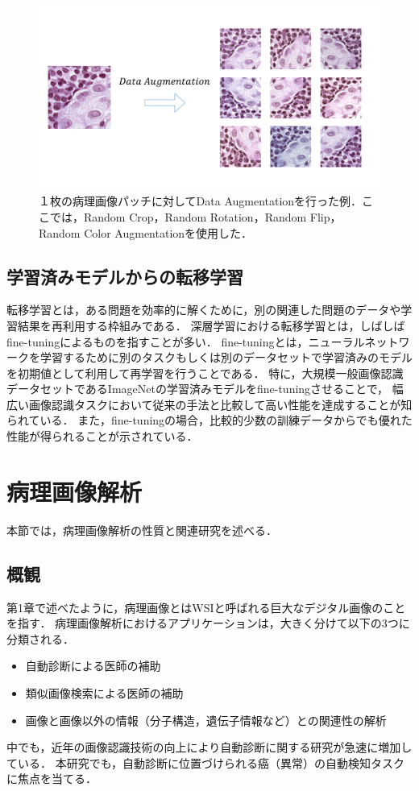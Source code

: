\begin{figure}[tbp]
     \begin{center}
      \includegraphics[width=12cm]{figures/data_augmentation.pdf}
     \end{center}
    \caption{\label{fig:data_augmentation}１枚の病理画像パッチに対してData Augmentationを行った例．ここでは，Random Crop，Random Rotation，Random Flip，Random Color Augmentationを使用した．}
\end{figure}

\subsection{学習済みモデルからの転移学習}
\label{sec:transfer}
転移学習とは，ある問題を効率的に解くために，別の関連した問題のデータや学習結果を再利用する枠組みである．
深層学習における転移学習とは，しばしばfine-tuningによるものを指すことが多い．
fine-tuningとは，ニューラルネットワークを学習するために別のタスクもしくは別のデータセットで学習済みのモデルを初期値として利用して再学習を行うことである．
特に，大規模一般画像認識データセットであるImageNet\cite{imagenet_cvpr09}の学習済みモデルをfine-tuningさせることで，
幅広い画像認識タスクにおいて従来の手法と比較して高い性能を達成することが知られている\cite{girshick2014rich, agrawal2014analyzing}．
また，fine-tuningの場合，比較的少数の訓練データからでも優れた性能が得られることが示されている．

\section{病理画像解析}
\label{sec:path_images}
本節では，病理画像解析の性質と関連研究を述べる．

\subsection{概観}
第1章で述べたように，病理画像とはWSIと呼ばれる巨大なデジタル画像のことを指す．
病理画像解析におけるアプリケーションは，大きく分けて以下の3つに分類される\cite{komuraishikawa}．
\begin{itemize}
    \item 自動診断による医師の補助
    \item 類似画像検索による医師の補助
    \item 画像と画像以外の情報（分子構造，遺伝子情報など）との関連性の解析
\end{itemize}
中でも，近年の画像認識技術の向上により自動診断に関する研究が急速に増加している\cite{doyle2008automated,dundar2011computerized}．
本研究でも，自動診断に位置づけられる癌（異常）の自動検知タスクに焦点を当てる．

